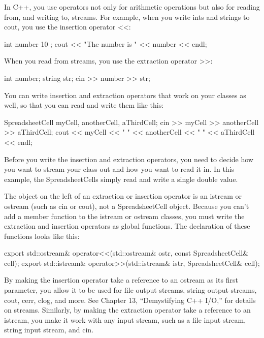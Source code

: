 In C++, you use operators not only for arithmetic operations but also for reading from, and writing to, streams. For example, when you write ints and strings to cout, you use the insertion operator <{}<:

\begin{cpp}
int number { 10 };
cout << "The number is " << number << endl;
\end{cpp}

When you read from streams, you use the extraction operator >{}>:

\begin{cpp}
int number;
string str;
cin >> number >> str;
\end{cpp}

You can write insertion and extraction operators that work on your classes as well, so that you can read and write them like this:

\begin{cpp}
SpreadsheetCell myCell, anotherCell, aThirdCell;
cin >> myCell >> anotherCell >> aThirdCell;
cout << myCell << " " << anotherCell << " " << aThirdCell << endl;
\end{cpp}

Before you write the insertion and extraction operators, you need to decide how you want to stream your class out and how you want to read it in. In this example, the SpreadsheetCells simply read and write a single double value.

The object on the left of an extraction or insertion operator is an istream or ostream (such as cin or cout), not a SpreadsheetCell object. Because you can’t add a member function to the istream or ostream classes, you must write the extraction and insertion operators as global functions. The declaration of these functions looks like this:

\begin{cpp}
export std::ostream& operator<<(std::ostream& ostr, const SpreadsheetCell& cell);
export std::istream& operator>>(std::istream& istr, SpreadsheetCell& cell);
\end{cpp}

By making the insertion operator take a reference to an ostream as its first parameter, you allow it to be used for file output streams, string output streams, cout, cerr, clog, and more. See Chapter 13, “Demystifying C++ I/O,” for details on streams. Similarly, by making the extraction operator take a reference to an istream, you make it work with any input stream, such as a file input stream, string input stream, and cin.

